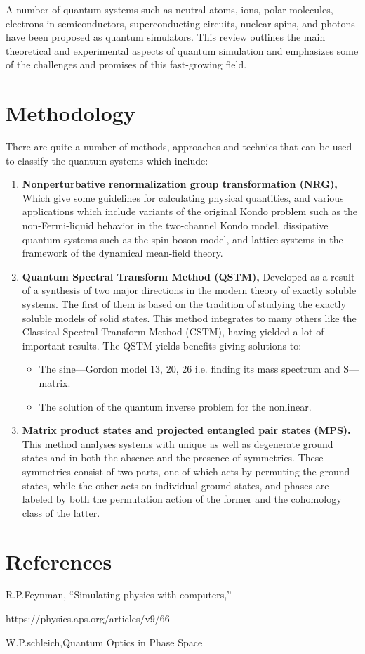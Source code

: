 \documentclass[options]{article}
\begin{document}
A number of quantum systems such as neutral atoms, ions, polar molecules, electrons in semiconductors, superconducting circuits, nuclear spins, and photons have been proposed as quantum simulators. This review outlines the main theoretical and experimental aspects of quantum simulation and emphasizes some of the challenges and promises of this fast-growing field.


\section {\textbf{Methodology}}
There are quite a number of methods, approaches and technics that can be used to classify the quantum systems which include:
\begin{enumerate}
  \item \textbf{Nonperturbative renormalization group transformation (NRG),}
Which give some guidelines for calculating physical quantities, and various applications which include variants of the original Kondo problem such as the non-Fermi-liquid behavior in the two-channel Kondo model, dissipative quantum systems such as the spin-boson model, and lattice systems in the framework of the dynamical mean-field theory.

   \item \textbf{Quantum Spectral Transform Method (QSTM), }
Developed as a result of a synthesis of two major directions in the modern theory of exactly soluble systems. The first of them is based on the tradition of studying the exactly soluble models of solid states. This method integrates to many others like the Classical Spectral Transform Method (CSTM), having yielded a lot of important results. The QSTM yields benefits giving solutions to:
\begin{itemize}
   \item  The sine—Gordon model 13, 20, 26 i.e. finding its mass spectrum and S—matrix.
   \item  The solution of the quantum inverse problem for the nonlinear.
\end{itemize}

   \item \textbf{Matrix product states and projected entangled pair states (MPS).}
This method analyses systems with unique as well as degenerate ground states and in both the absence and the presence of symmetries. These symmetries consist of two parts, one of which acts by permuting the ground states, while the other acts on individual ground states, and phases are labeled by both the permutation action of the former and the cohomology class of the latter.

\end{enumerate}

\section{\textbf{References}}
R.P.Feynman, “Simulating physics with computers,”

https://physics.aps.org/articles/v9/66 

W.P.schleich,Quantum Optics in Phase Space 
\end{document}
